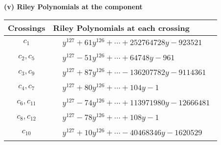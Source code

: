 \documentclass[1p]{elsarticle_modified}
\theoremstyle{definition}
\begin{document}
\newpage\renewcommand{\arraystretch}{1}
\flushleft \textbf{(v) Riley Polynomials at the component}\newline \\
\begin{tabular}{m{50pt}|m{274pt}}
Crossings & \hspace{64pt}Riley Polynomials at each crossing \\
\hline $$\begin{aligned}c_{1}\end{aligned}$$&$\begin{aligned}
&y^{127}+61 y^{126}+\cdots+252764728 y-923521
\end{aligned}$\\
\hline $$\begin{aligned}c_{2},c_{5}\end{aligned}$$&$\begin{aligned}
&y^{127}-51 y^{126}+\cdots+64748 y-961
\end{aligned}$\\
\hline $$\begin{aligned}c_{3},c_{9}\end{aligned}$$&$\begin{aligned}
&y^{127}+87 y^{126}+\cdots-136207782 y-9114361
\end{aligned}$\\
\hline $$\begin{aligned}c_{4},c_{7}\end{aligned}$$&$\begin{aligned}
&y^{127}+80 y^{126}+\cdots+104 y-1
\end{aligned}$\\
\hline $$\begin{aligned}c_{6},c_{11}\end{aligned}$$&$\begin{aligned}
&y^{127}-74 y^{126}+\cdots+113971980 y-12666481
\end{aligned}$\\
\hline $$\begin{aligned}c_{8},c_{12}\end{aligned}$$&$\begin{aligned}
&y^{127}-78 y^{126}+\cdots+108 y-1
\end{aligned}$\\
\hline $$\begin{aligned}c_{10}\end{aligned}$$&$\begin{aligned}
&y^{127}+10 y^{126}+\cdots-40468346 y-1620529
\end{aligned}$\\
\hline
\end{tabular}\\~\\
\end{document}
